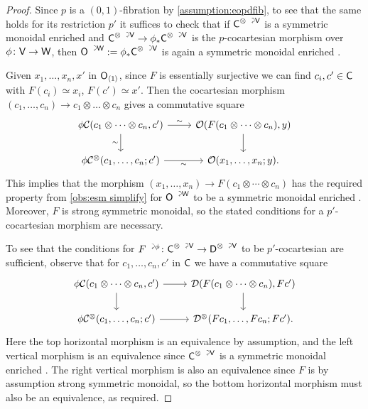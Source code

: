 \documentclass[a4paper,11pt]{article}
\begin{document}
\begin{proof}
  Since $p$ is a $(0,1)$-fibration by \cref{assumption:eopdfib}, to
  see that the same holds for its restriction $p'$ it suffices to
  check that if $\utract{C}{V}$ is a symmetric monoidal enriched
  \icat{} and $\utract{C}{V} \to \phi_{*}\utract{C}{V}$ is the
  $p$-cocartesian morphism over $\phi \colon \oV \to \oW$, then
  $\uract{O}{W} := \phi_{*}\utract{C}{V}$ is again a symmetric
  monoidal enriched \icat{}.

  Given $x_{1},\dots,x_{n},x'$ in $\textup{\textsf{O}}_{\langle 1 \rangle}$, since $F$ is
  essentially surjective we can find $c_{i},c' \in \textup{\textsf{C}}$ with $F(c_{i})
  \simeq x_{i}$, $F(c')\simeq x'$. Then the cocartesian morphism
  $(c_{1}, \dots, c_{n}) \to c_{1} \otimes \dots \otimes c_{n}$
  gives a commutative square
  \[
    \begin{tikzcd}
     \phi \eC(c_{1}\otimes \cdots \otimes c_{n}, c') \ar[r, "\sim"]
     \ar[d, "\sim"'] & \eO(F(c_{1} \otimes \cdots \otimes c_{n}), y)  \ar[d] \\
     \phi \eC^{\otimes}(c_{1},\dots,c_{n};c') \ar[r, "\sim"'] &
     \eO(x_{1},\dots,x_{n}; y).
    \end{tikzcd}
  \]
  This implies that the morphism
  $(x_{1},\dots,x_{n}) \to F(c_{1} \otimes \cdots \otimes c_{n})$ has the required
  property from \cref{obs:esm simplify} for $\uract{O}{W}$ to be a
  symmetric monoidal enriched \icat{}. Moreover, $F$ is strong
  symmetric monoidal, so the stated conditions for a $p'$-cocartesian
  morphism are necessary.

  To see that the conditions for $\ract{F}{\phi} \colon \utract{C}{V}
  \to \utract{D}{V}$ to be $p'$-cocartesian are sufficient, observe
  that for $c_{1},\dots,c_{n},c'$ in $\textup{\textsf{C}}$ we have a commutative square
  \[
    \begin{tikzcd}
     \phi \eC(c_{1} \otimes \cdots \otimes c_{n}, c') \ar[r]
     \ar[d] & \eD(F(c_{1} \otimes \cdots \otimes c_{n}), Fc')  \ar[d] \\
     \phi \eC^{\otimes}(c_{1},\dots,c_{n}; c') \ar[r] &
     \eD^{\otimes}(Fc_{1},\dots,Fc_{n}; Fc').
    \end{tikzcd}
  \]
  Here the top horizontal morphism is an equivalence by assumption,
  and the left vertical morphism is an equivalence since
  $\utract{C}{V}$ is a symmetric monoidal enriched \icat{}. The right
  vertical morphism is also an equivalence since $F$ is by assumption
  strong symmetric monoidal, so the bottom horizontal morphism must
  also be an equivalence, as required.
\end{proof}
\end{document}
